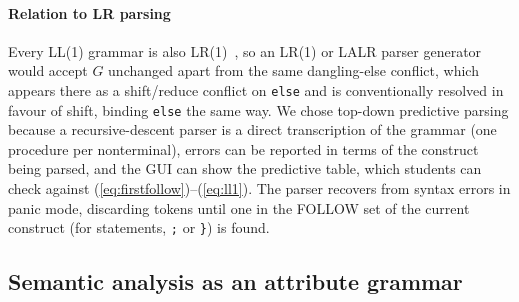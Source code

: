 \documentclass[conference]{IEEEtran}
\newcommand{\tm}[1]{\texttt{#1}}
\begin{document}
\paragraph*{Relation to LR parsing}
Every LL(1) grammar is also LR(1)~\cite{knuth1965lr,lewis1968}, so an
LR(1) or LALR parser generator would accept $G$ unchanged apart from the
same dangling-else conflict, which appears there as a shift/reduce
conflict on \tm{else} and is conventionally resolved in favour of
shift, binding \tm{else} the same way. We chose top-down predictive
parsing because a recursive-descent parser is a direct transcription of
the grammar (one procedure per nonterminal), errors can be reported in
terms of the construct being parsed, and the GUI can show the
predictive table, which students can check against
(\ref{eq:firstfollow})--(\ref{eq:ll1}). The parser recovers from syntax
errors in panic mode, discarding tokens until one in the FOLLOW set of
the current construct (for statements, \tm{;} or \tm{\}}) is found.

\subsection{Semantic analysis as an attribute grammar}
\end{document}
